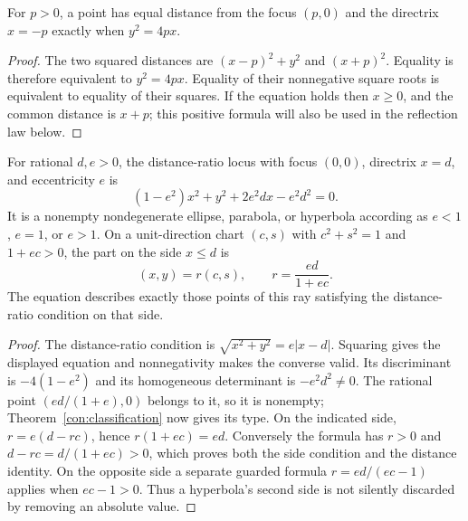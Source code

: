 \begin{theorem}\label{con:parabola-foci}
For $p>0$, a point has equal distance from the focus $(p,0)$ and the
directrix $x=-p$ exactly when $y^2=4px$.
\end{theorem}
\begin{proof}
The two squared distances are $(x-p)^2+y^2$ and $(x+p)^2$.
Equality is therefore equivalent to $y^2=4px$. Equality of their
nonnegative square roots is equivalent to equality of their squares.
If the equation holds then $x\ge0$, and the common distance is $x+p$;
this positive formula will also be used in the reflection law below.
\end{proof}

\begin{theorem}\label{con:directrix}
For rational $d,e>0$, the distance-ratio locus with focus $(0,0)$,
directrix $x=d$, and eccentricity $e$ is
\[
 (1-e^2)x^2+y^2+2e^2dx-e^2d^2=0.
\]
It is a nonempty nondegenerate ellipse, parabola, or hyperbola according
as $e<1$, $e=1$, or $e>1$. On a unit-direction chart $(c,s)$ with
$c^2+s^2=1$ and $1+ec>0$, the part on the side $x\le d$ is
\[
 (x,y)=r(c,s),\qquad r=\frac{ed}{1+ec}.
\]
The equation describes exactly those points of this ray satisfying the
distance-ratio condition on that side.
\end{theorem}
\begin{proof}
The distance-ratio condition is
$\sqrt{x^2+y^2}=e|x-d|$. Squaring gives the displayed equation and
nonnegativity makes the converse valid. Its discriminant is
$-4(1-e^2)$ and its homogeneous determinant is $-e^2d^2\ne0$.
The rational point $(ed/(1+e),0)$ belongs to it, so it is nonempty;
Theorem~\ref{con:classification} now gives its type.
On the indicated side, $r=e(d-rc)$, hence $r(1+ec)=ed$.
Conversely the formula has $r>0$ and
$d-rc=d/(1+ec)>0$, which proves both the side condition and the
distance identity. On the opposite side a separate guarded formula
$r=ed/(ec-1)$ applies when $ec-1>0$. Thus a hyperbola's second side
is not silently discarded by removing an absolute value.
\end{proof}

